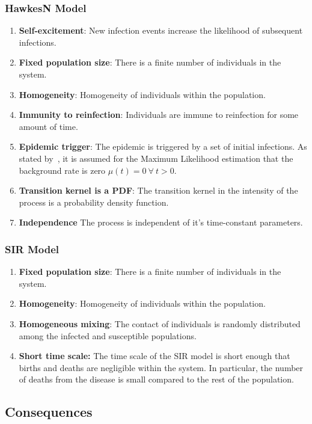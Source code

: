 \documentclass[12pt]{article}
\begin{document}
\subsubsection{HawkesN Model}
\begin{enumerate}
\item {\bf Self-excitement}: New infection events increase the likelihood of subsequent infections.
\item {\bf Fixed population size}: There is a finite number of individuals in the system.
\item {\bf Homogeneity}: Homogeneity of individuals within the population.
\item {\bf Immunity to reinfection}: Individuals are immune to reinfection for some amount of time. 
\item {\bf Epidemic trigger}: The epidemic is triggered by a set of initial infections. As stated by~\cite{Rizoiu2018}, it is assumed for the Maximum Likelihood estimation that the background rate is zero $\mu(t) = 0\ \forall\ t>0$. 
\item {\bf Transition kernel is a PDF}: The transition kernel in the intensity of the process is a probability density function. 
\item {\bf Independence} The process is independent of it's time-constant parameters. 
\end{enumerate}


\subsubsection{SIR Model}
\begin{enumerate}
\item {\bf Fixed population size}: There is a finite number of individuals in the system.
\item {\bf Homogeneity}: Homogeneity of individuals within the population.
\item {\bf Homogeneous mixing}: The contact of individuals is randomly distributed among the infected and susceptible populations.  
\item {\bf Short time scale:} The time scale of the SIR model is short enough that births and deaths are negligible within the system. In particular, the number of deaths from the disease is small compared to the rest of the population. 
\end{enumerate}

\subsection{Consequences}
\end{document}
